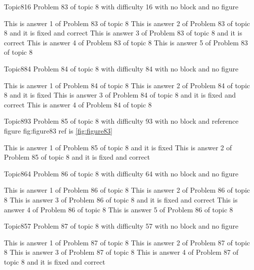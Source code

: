 \documentclass[master]{exam}
\begin{document}
\begin{problem}{Topic8}{16}
	Problem 83 of topic 8 with difficulty 16 with no block and no figure
	\begin{answers}
		\answer This is answer 1 of Problem 83 of topic 8 
		 This is answer 2 of Problem 83 of topic 8 and it is fixed and correct
		\answer[correct] This is answer 3 of Problem 83 of topic 8 and it is correct
		\answer This is answer 4 of Problem 83 of topic 8 
		\answer This is answer 5 of Problem 83 of topic 8 
	\end{answers}
\end{problem}

\begin{problem}{Topic8}{84}
	Problem 84 of topic 8 with difficulty 84 with no block and no figure
	\begin{answers}
		\answer This is answer 1 of Problem 84 of topic 8 
		\answer[fixed] This is answer 2 of Problem 84 of topic 8 and it is fixed
		 This is answer 3 of Problem 84 of topic 8 and it is fixed and correct
		\answer This is answer 4 of Problem 84 of topic 8 
	\end{answers}
\end{problem}

\begin{problem}{Topic8}{93}
	Problem 85 of topic 8 with difficulty 93 with no block and reference figure fig:figure83 ref is \ref{fig:figure83}
	\begin{answers}
		\answer[fixed] This is answer 1 of Problem 85 of topic 8 and it is fixed
		 This is answer 2 of Problem 85 of topic 8 and it is fixed and correct
	\end{answers}
\end{problem}

\begin{problem}{Topic8}{64}
	Problem 86 of topic 8 with difficulty 64 with no block and no figure
	\begin{answers}
		\answer This is answer 1 of Problem 86 of topic 8 
		\answer This is answer 2 of Problem 86 of topic 8 
		 This is answer 3 of Problem 86 of topic 8 and it is fixed and correct
		\answer This is answer 4 of Problem 86 of topic 8 
		\answer This is answer 5 of Problem 86 of topic 8 
	\end{answers}
\end{problem}

\begin{problem}{Topic8}{57}
	Problem 87 of topic 8 with difficulty 57 with no block and no figure
	\begin{answers}
		\answer This is answer 1 of Problem 87 of topic 8 
		\answer This is answer 2 of Problem 87 of topic 8 
		\answer This is answer 3 of Problem 87 of topic 8 
		 This is answer 4 of Problem 87 of topic 8 and it is fixed and correct
	\end{answers}
\end{problem}
\end{document}
